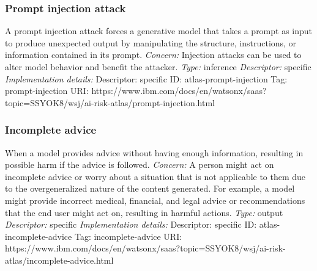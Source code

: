 \documentclass{article}
\begin{document}
\subsubsection*{Prompt injection attack}
A prompt injection attack forces a generative model that takes a prompt as input to produce unexpected output by manipulating the structure, instructions, or information contained in its prompt.\newline
\textit{Concern: }Injection attacks can be used to alter model behavior and benefit the attacker.\newline\newline
\textit{Type: }inference\newline
\textit{Descriptor: }specific \newline\newline
\textit{Implementation details:} \newline
Descriptor: specific \newline
ID: atlas-prompt-injection \newline
Tag: prompt-injection \newline
URI:  https://www.ibm.com/docs/en/watsonx/saas?topic=SSYOK8/wsj/ai-risk-atlas/prompt-injection.html\newline
\subsubsection*{Incomplete advice}
When a model provides advice without having enough information, resulting in possible harm if the advice is followed.\newline
\textit{Concern: }A person might act on incomplete advice or worry about a situation that is not applicable to them due to the overgeneralized nature of the content generated. For example, a model might provide incorrect medical, financial, and legal advice or recommendations that the end user might act on, resulting in harmful actions.\newline\newline
\textit{Type: }output\newline
\textit{Descriptor: }specific \newline\newline
\textit{Implementation details:} \newline
Descriptor: specific \newline
ID: atlas-incomplete-advice \newline
Tag: incomplete-advice \newline
URI:  https://www.ibm.com/docs/en/watsonx/saas?topic=SSYOK8/wsj/ai-risk-atlas/incomplete-advice.html\newline
\end{document}
